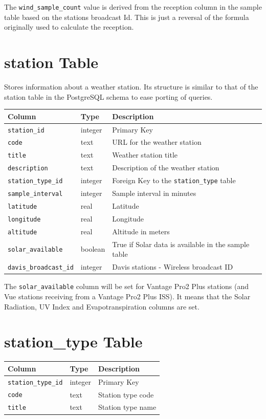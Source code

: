 \documentclass[a4paper,10pt]{book}
\begin{document}
The \verb|wind_sample_count| value is derived from the reception column in the sample table based on the stations broadcast Id. This is just a reversal of the formula originally used to calculate the reception.

\section{station Table}
Stores information about a weather station. Its structure is similar to that of the station table in the PostgreSQL schema to ease porting of queries.

\begin{tabular}{p{3.5cm} p{1.3cm} l}
\hline
\textbf{Column} & \textbf{Type} & \textbf{Description} \\
\hline
\verb|station_id| & integer & Primary Key\\
\verb|code| & text & URL for the weather station  \\
\verb|title| & text & Weather station title\\
\verb|description| & text & Description of the weather station\\
\verb|station_type_id| & integer & Foreign Key to the \verb|station_type| table\\
\verb|sample_interval| & integer & Sample interval in minutes\\
\verb|latitude| & real & Latitude\\
\verb|longitude| & real & Longitude\\
\verb|altitude| & real & Altitude in meters\\
\verb|solar_available| & boolean & True if Solar data is available in the sample table\\
\verb|davis_broadcast_id| & integer & Davis stations - Wireless broadcast ID\\
\hline
\end{tabular}

The \verb|solar_available| column will be set for Vantage Pro2 Plus stations (and Vue stations receiving from a Vantage Pro2 Plus ISS). It means that the Solar Radiation, UV Index and Evapotranspiration columns are set.

\section{station\_type Table}
\begin{tabular}{p{3cm} p{2.5cm} l}
\hline
\textbf{Column} & \textbf{Type} & \textbf{Description} \\
\hline
\verb|station_type_id| & integer & Primary Key\\
\verb|code| & text & Station type code\\
\verb|title| & text & Station type name\\
\hline
\end{tabular}
\end{document}
